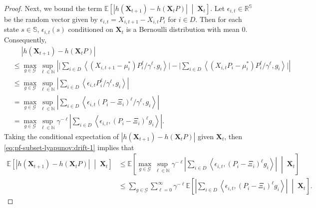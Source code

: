 \documentclass{article}
\theoremstyle{plain}
\theoremstyle{remark}
\newcommand{\E}[1]{\mathbb{E}\left[#1\right]}
\newcommand{\givenmiddle}{\;\middle|\;}
\newcommand{\R}{\mathbb{R}}
\newcommand{\abs}[1]{\left\lvert#1\right\rvert}
\newcommand{\absbigg}[1]{\bigg\lvert#1\bigg\rvert}
\newcommand{\sspa}{\mathbb{S}}
\newcommand{\sumell}{\sum_{\ell=0}^\infty}
\newcommand{\supell}{\sup_{\ell\in\mathbb{N}}}
\def\mX{{\bm{X}}}
\newcommand{\EE}{\mathbb{E}}
\newcommand{\innerproduct}[2]{\left\langle #1, #2 \right\rangle}
\newcommand{\mbracket}[1]{\left[#1\right]}
\begin{document}
\begin{proof}
Next, we bound the term $\EE\mbracket{\abs{h(\mX_{t+1})-h(\mX_tP)}\givenmiddle\mX_t}$. 
Let $\epsilon_{i,t} \in \R^{\sspa}$ be the random vector given by $\epsilon_{i,t} = X_{i,t+1}-X_{i,t}P_i$ for $i\in D$. Then for each state $s\in\sspa$, $\epsilon_{i,t}(s)$ conditioned on $\mX_t$ is a Bernoulli distribution with mean $0$. Consequently, 
\begin{align}
    \nonumber
    &\mspace{23mu} \abs{h(\mX_{t+1})-h(\mX_tP)}\\
    \nonumber
    &\leq \max_{g\in \mathcal{G}} \supell \abs{\absbigg{\sum_{i\in D}\innerproduct{(X_{i,t+1}-\mu_i^*)P_i^{\ell}/\gamma^{\ell}}{g_i}}-\absbigg{\sum_{i\in D} \innerproduct{(X_{i,t}P_i-\mu_i^*)P_i^{\ell}/\gamma^{\ell}}{g_i}}}\\ 
    \nonumber 
    &\leq \max_{g\in \mathcal{G}} \supell \abs{\sum_{i\in D}\innerproduct{\epsilon_{i,t}P_i^{\ell}/\gamma^{\ell}}{g_i}} \\
    \nonumber
    &= \max_{g\in \mathcal{G}} \supell \abs{\sum_{i\in D}\innerproduct{\epsilon_{i,t}(P_i-\Xi_i)^{\ell}/\gamma^{\ell}}{g_i}}\\
    \label{eq:pf-subset-lyapunov:drift-1}
    &= \max_{g\in \mathcal{G}} \supell \gamma^{-\ell} \abs{\sum_{i\in D}\innerproduct{\epsilon_{i,t}}{(P_i-\Xi_i)^{\ell}g_i}}. 
\end{align}
Taking the conditional expectation of $\abs{h(\mX_{t+1})-h(\mX_tP)}$ given $\mX_t$, then \eqref{eq:pf-subset-lyapunov:drift-1} implies that 
\begin{align}
    \nonumber \EE\mbracket{\abs{h(\mX_{t+1})-h(\mX_tP)}\givenmiddle\mX_t}
    &\leq \E{\max_{g\in \mathcal{G}} \supell \gamma^{-\ell} \abs{\sum_{i\in D}\innerproduct{\epsilon_{i,t}}{(P_i-\Xi_i)^{\ell}g_i}} \givenmiddle \mX_t} \\
     \label{eq:pf-subset-lyapunov:drift-1-5}
    &\leq \sum_{g\in \mathcal{G}} \sumell  \gamma^{-\ell} \E{ \abs{\sum_{i\in D}\innerproduct{\epsilon_{i,t}}{(P_i-\Xi_i)^{\ell}g_i}} \givenmiddle \mX_t}.
\end{align}


\end{proof}
\end{document}
